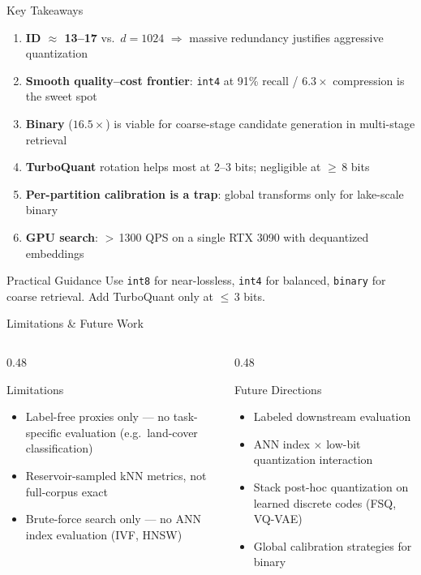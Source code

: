 \documentclass[aspectratio=169,10pt]{beamer}
\begin{document}
\begin{frame}{Key Takeaways}
	\begin{enumerate}
		\item \textbf{ID $\approx$ 13--17} vs.\ $d = 1024$
		      $\Rightarrow$ massive redundancy justifies aggressive quantization
		\item \textbf{Smooth quality--cost frontier}: \texttt{int4} at 91\% recall
		      / $6.3\times$ compression is the sweet spot
		\item \textbf{Binary} ($16.5\times$) is viable for coarse-stage candidate
		      generation in multi-stage retrieval
		\item \textbf{TurboQuant} rotation helps most at 2--3 bits;
		      negligible at $\geq$\,8 bits
		\item \textbf{Per-partition calibration is a trap}: global transforms only
		      for lake-scale binary
		\item \textbf{GPU search}: $>$\,1300 QPS on a single RTX 3090 with
		      dequantized embeddings
	\end{enumerate}

	\vfill
	\begin{alertblock}{Practical Guidance}
		Use \texttt{int8} for near-lossless, \texttt{int4} for balanced,
		\texttt{binary} for coarse retrieval. Add TurboQuant only at $\leq$\,3 bits.
	\end{alertblock}
\end{frame}

\begin{frame}{Limitations \& Future Work}
	\begin{columns}[T]
		\begin{column}{0.48\textwidth}
			\begin{block}{Limitations}
				\begin{itemize}
					\item Label-free proxies only --- no task-specific evaluation
					      (e.g.\ land-cover classification)
					\item Reservoir-sampled kNN metrics, not full-corpus exact
					\item Brute-force search only --- no ANN index evaluation
					      (IVF, HNSW)
				\end{itemize}
			\end{block}
		\end{column}
		\begin{column}{0.48\textwidth}
			\begin{block}{Future Directions}
				\begin{itemize}
					\item Labeled downstream evaluation
					\item ANN index $\times$ low-bit quantization interaction
					\item Stack post-hoc quantization on learned discrete codes
					      (FSQ, VQ-VAE)
					\item Global calibration strategies for binary
				\end{itemize}
			\end{block}
		\end{column}
	\end{columns}
\end{frame}
\end{document}
